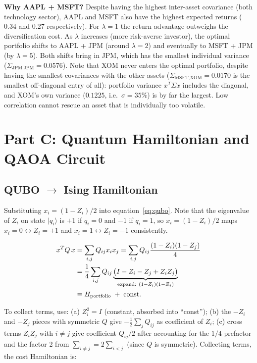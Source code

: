 \documentclass[a4paper,11pt]{article}
\begin{document}
\begin{finbox}
\textbf{Why AAPL + MSFT?} Despite having the highest inter-asset
covariance (both technology sector), AAPL and MSFT also have the
highest expected returns ($0.34$ and $0.27$ respectively). For
$\lambda=1$ the return advantage outweighs the diversification cost.
As $\lambda$ increases (more risk-averse investor), the optimal
portfolio shifts to AAPL + JPM (around $\lambda=2$) and eventually to
MSFT + JPM (by $\lambda=5$). Both shifts bring in JPM, which has the
smallest individual variance ($\Sigma_{\text{JPM,JPM}}=0.0576$).
Note that XOM never enters the optimal portfolio, despite having the
smallest covariances with the other assets
($\Sigma_{\text{MSFT,XOM}}=0.0170$ is the smallest off-diagonal entry
of all): portfolio variance $x^T\Sigma x$ includes the diagonal, and
XOM's own variance ($0.1225$, i.e.\ $\sigma=35\%$) is by far the
largest. Low correlation cannot rescue an asset that is individually
too volatile.
\end{finbox}

\section{Part C: Quantum Hamiltonian and QAOA Circuit}

\subsection{QUBO $\to$ Ising Hamiltonian}

Substituting $x_i = (1 - Z_i)/2$ into equation~\eqref{eq:qubo}.
Note that the eigenvalue of $Z_i$ on state $|q_i\rangle$ is $+1$ if $q_i=0$ and
$-1$ if $q_i=1$, so $x_i=(1-Z_i)/2$ maps $x_i=0\leftrightarrow Z_i=+1$ and
$x_i=1\leftrightarrow Z_i=-1$ consistently.

\begin{align}
    x^T Q\, x &= \sum_{i,j} Q_{ij} x_i x_j
    = \sum_{i,j} Q_{ij} \frac{(1-Z_i)(1-Z_j)}{4} \notag\\
    &= \frac{1}{4}\sum_{i,j} Q_{ij}
    \underbrace{\bigl(I - Z_i - Z_j + Z_iZ_j\bigr)}_{\text{expand: }(1-Z_i)(1-Z_j)}
    \notag\\
    &\equiv H_\text{portfolio} \;+\; \text{const.}
    \label{eq:ising-map}
\end{align}

To collect terms, use: (a) $Z_i^2 = I$ (constant, absorbed into ``const'');
(b) the $-Z_i$ and $-Z_j$ pieces with symmetric $Q$ give $-\frac{1}{2}\sum_j Q_{ij}$
as coefficient of $Z_i$; (c) cross terms $Z_iZ_j$ with $i\neq j$ give coefficient
$Q_{ij}/2$ after accounting for the $1/4$ prefactor and the factor 2 from
$\sum_{i\neq j} = 2\sum_{i<j}$ (since $Q$ is symmetric).
Collecting terms, the cost Hamiltonian is:
\end{document}
